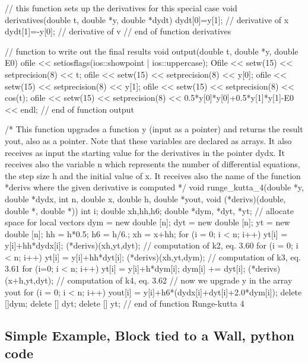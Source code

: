 \documentclass[%
oneside,                 %
final,                   %
10pt]{article}
\begin{document}
//   this function sets up the derivatives for this special case  
void derivatives(double t, double *y, double *dydt)
{
  dydt[0]=y[1];    // derivative of x 
  dydt[1]=-y[0]; // derivative of v 
} // end of function derivatives  

//    function to write out the final results
void output(double t, double *y, double E0)
{
  ofile << setiosflags(ios::showpoint | ios::uppercase);
  Ofile << setw(15) << setprecision(8) << t;
  ofile << setw(15) << setprecision(8) << y[0];
  ofile << setw(15) << setprecision(8) << y[1];
  ofile << setw(15) << setprecision(8) << cos(t);
  ofile << setw(15) << setprecision(8) << 
    0.5*y[0]*y[0]+0.5*y[1]*y[1]-E0 << endl;
}  // end of function output

/*   This function upgrades a function y (input as a pointer)
     and returns the result yout, also as a pointer. Note that
     these variables are declared as arrays.  It also receives as
     input the starting value for the derivatives in the pointer
     dydx. It receives also the variable n which represents the 
     number of differential equations, the step size h and 
     the initial value of x. It receives also the name of the
     function *derivs where the given derivative is computed
*/
void runge_kutta_4(double *y, double *dydx, int n, double x, double h, 
                   double *yout, void (*derivs)(double, double *, double *))
{
  int i;
  double      xh,hh,h6; 
  double *dym, *dyt, *yt;
  //   allocate space for local vectors   
  dym = new double [n];
  dyt =  new double [n];
  yt =  new double [n];
  hh = h*0.5;
  h6 = h/6.;
  xh = x+hh;
  for (i = 0; i < n; i++) {
    yt[i] = y[i]+hh*dydx[i];
  }
  (*derivs)(xh,yt,dyt);     // computation of k2, eq. 3.60   
  for (i = 0; i < n; i++) {
    yt[i] = y[i]+hh*dyt[i];
  }
  (*derivs)(xh,yt,dym); //  computation of k3, eq. 3.61   
  for (i=0; i < n; i++) {
    yt[i] = y[i]+h*dym[i];
    dym[i] += dyt[i];
  }
  (*derivs)(x+h,yt,dyt);    // computation of k4, eq. 3.62   
  //      now we upgrade y in the array yout  
  for (i = 0; i < n; i++){
    yout[i] = y[i]+h6*(dydx[i]+dyt[i]+2.0*dym[i]);
  }
  delete []dym;
  delete [] dyt;
  delete [] yt;
}       //  end of function Runge-kutta 4  
\epypro



\subsection{Simple Example, Block tied to a Wall, python code}
\end{document}
